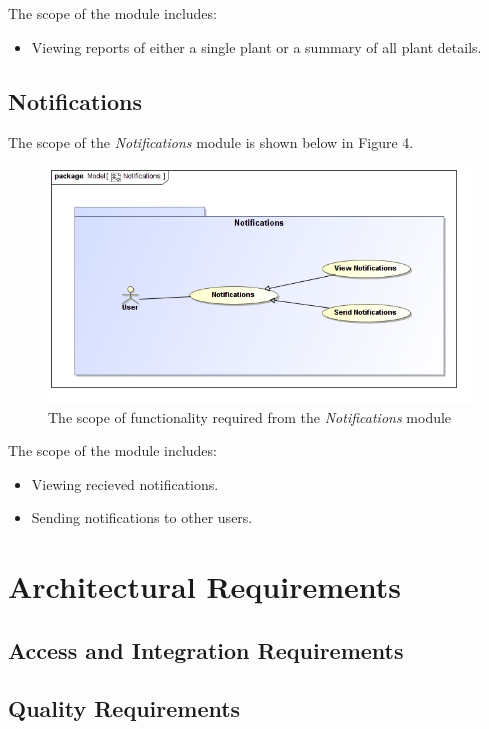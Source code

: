 \documentclass{article}
\begin{document}
		The scope of the \emph{} module includes:
		
		\begin{itemize}
			\item Viewing reports of either a single plant or a summary of all plant details.
		\end{itemize}
		
	\pagebreak
	\subsection{Notifications}
		The scope of the \emph{Notifications} module is shown below in Figure 4.
		
		\begin{figure}[H]
			\centering
			\includegraphics[width=\textwidth]{Notifications.jpg}
			\caption{The scope of functionality required from the \emph{Notifications} module}
		\end{figure}
		
		The scope of the \emph{} module includes:
		
		\begin{itemize}
			\item Viewing recieved notifications.
			\item Sending notifications to other users.
		\end{itemize}

\cleardoublepage

\section{Architectural Requirements}
\subsection{Access and Integration Requirements}
\subsection{Quality Requirements}
\end{document}
